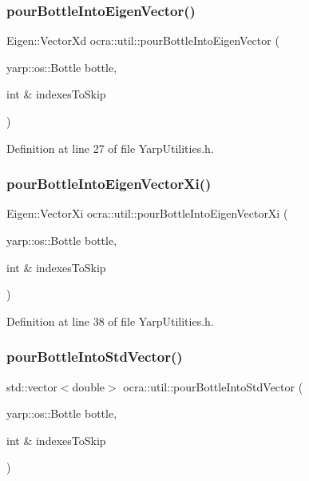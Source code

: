 \subsubsection{\texorpdfstring{pour\+Bottle\+Into\+Eigen\+Vector()}{pourBottleIntoEigenVector()}}
{\footnotesize\ttfamily Eigen\+::\+Vector\+Xd ocra\+::util\+::pour\+Bottle\+Into\+Eigen\+Vector (\begin{DoxyParamCaption}\item[{yarp\+::os\+::\+Bottle}]{bottle,  }\item[{int \&}]{indexes\+To\+Skip }\end{DoxyParamCaption})\hspace{0.3cm}{\ttfamily [inline]}}



Definition at line 27 of file Yarp\+Utilities.\+h.

\hypertarget{namespaceocra_1_1util_a2bdcb149a446d1048692192e2ce82e9d}{}\label{namespaceocra_1_1util_a2bdcb149a446d1048692192e2ce82e9d} 
\subsubsection{\texorpdfstring{pour\+Bottle\+Into\+Eigen\+Vector\+Xi()}{pourBottleIntoEigenVectorXi()}}
{\footnotesize\ttfamily Eigen\+::\+Vector\+Xi ocra\+::util\+::pour\+Bottle\+Into\+Eigen\+Vector\+Xi (\begin{DoxyParamCaption}\item[{yarp\+::os\+::\+Bottle}]{bottle,  }\item[{int \&}]{indexes\+To\+Skip }\end{DoxyParamCaption})\hspace{0.3cm}{\ttfamily [inline]}}



Definition at line 38 of file Yarp\+Utilities.\+h.

\hypertarget{namespaceocra_1_1util_ae43554408032d294cf5486321de608ad}{}\label{namespaceocra_1_1util_ae43554408032d294cf5486321de608ad} 
\subsubsection{\texorpdfstring{pour\+Bottle\+Into\+Std\+Vector()}{pourBottleIntoStdVector()}}
{\footnotesize\ttfamily std\+::vector$<$double$>$ ocra\+::util\+::pour\+Bottle\+Into\+Std\+Vector (\begin{DoxyParamCaption}\item[{yarp\+::os\+::\+Bottle}]{bottle,  }\item[{int \&}]{indexes\+To\+Skip }\end{DoxyParamCaption})\hspace{0.3cm}{\ttfamily [inline]}}



